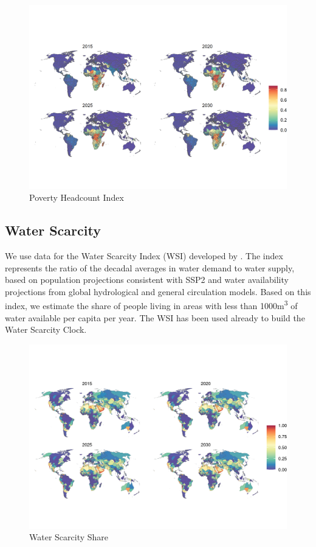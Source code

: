 \documentclass{article}
\begin{document}
\begin{figure}[H]
  \centering
  \includegraphics[width=\linewidth]{img/covars/hci.png}
  \caption{Poverty Headcount Index}
\end{figure}

\pagebreak
\subsection{Water Scarcity}
We use data for the Water Scarcity Index (WSI) developed by \citep{greve2018global}. The index represents the ratio of the decadal averages in water demand to water supply, based on population projections consistent with SSP2 and water availability projections from global hydrological and general circulation models.  Based on this index, we estimate the share of people living in areas with less than 1000m\textsuperscript{3} of water available per capita per year. The WSI has been used already to build the Water Scarcity Clock.

\begin{figure}[H]
  \centering
  \includegraphics[width=\linewidth]{img/covars/ws_share.png}
  \caption{Water Scarcity Share}
\end{figure}
\end{document}
